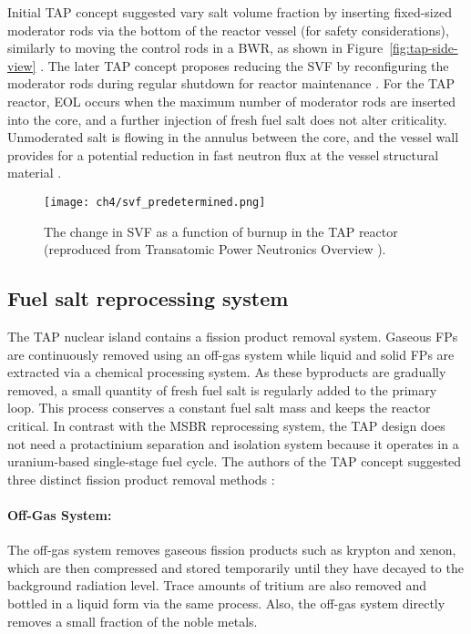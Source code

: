 Initial \gls{TAP} concept suggested vary salt volume fraction by inserting 
fixed-sized moderator rods via the bottom of the reactor vessel (for safety 
considerations), similarly to moving the control rods in a \gls{BWR}, as shown 
in Figure~\ref{fig:tap-side-view} 
\cite{transatomic_power_corporation_neutronics_2016}. The later \gls{TAP} 
concept proposes reducing the \gls{SVF} by reconfiguring the moderator rods 
during regular shutdown for reactor maintenance 
\cite{betzler_assessment_2017-1}. For the 
\gls{TAP} reactor, \gls{EOL} occurs when the maximum number of moderator rods 
are inserted into the core, and a further injection of fresh fuel salt does 
not alter criticality. Unmoderated salt is flowing in the annulus between the 
core, and the vessel wall provides for a potential reduction in fast neutron 
flux at the vessel structural material .
\begin{figure}[t] %
	\texttt{[image: ch4/svf\_predetermined.png]}
	\caption{The change in SVF as a function of burnup in the \gls{TAP} 
	reactor (reproduced from Transatomic Power Neutronics Overview  
	\cite{transatomic_power_corporation_neutronics_2016}).}
	\label{fig:svf-predetermined}
\end{figure}


\subsection{Fuel salt reprocessing system}
The \gls{TAP} nuclear island contains a fission product removal system. 
Gaseous \glspl{FP} are continuously removed using an off-gas system while 
liquid and 
solid \glspl{FP} are extracted via a chemical processing system. As these 
byproducts are gradually removed, a small quantity of fresh fuel salt is 
regularly added to the primary loop. This process conserves a constant fuel 
salt mass and keeps the reactor critical. In contrast with the \gls{MSBR} 
reprocessing system, the \gls{TAP} design does not need a protactinium 
separation and isolation system because it operates in a uranium-based 
single-stage fuel cycle. The authors of the \gls{TAP} concept suggested three 
distinct fission product removal methods 
\cite{transatomic_power_corporation_neutronics_2016}:
\paragraph*{Off-Gas System:} The off-gas system removes gaseous fission 
products such as krypton and xenon, which are then compressed and stored 
temporarily until they have decayed to the background radiation level. Trace 
amounts of tritium are also removed and bottled in a liquid form via the same 
process. Also, the off-gas system directly removes a small fraction of the 
noble metals.

